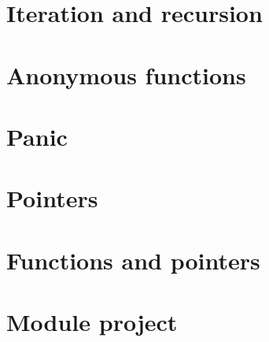 \documentclass[]{book}
\begin{document}
\hypertarget{iteration-and-recursion}{%
\section{Iteration and recursion}\label{iteration-and-recursion}}

\hypertarget{anonymous-functions}{%
\section{Anonymous functions}\label{anonymous-functions}}

\hypertarget{panic}{%
\section{Panic}\label{panic}}

\hypertarget{pointers}{%
\section{Pointers}\label{pointers}}

\hypertarget{functions-and-pointers-1}{%
\section{Functions and pointers}\label{functions-and-pointers-1}}

\hypertarget{module-project-3}{%
\section*{Module project}\label{module-project-3}}
\end{document}
